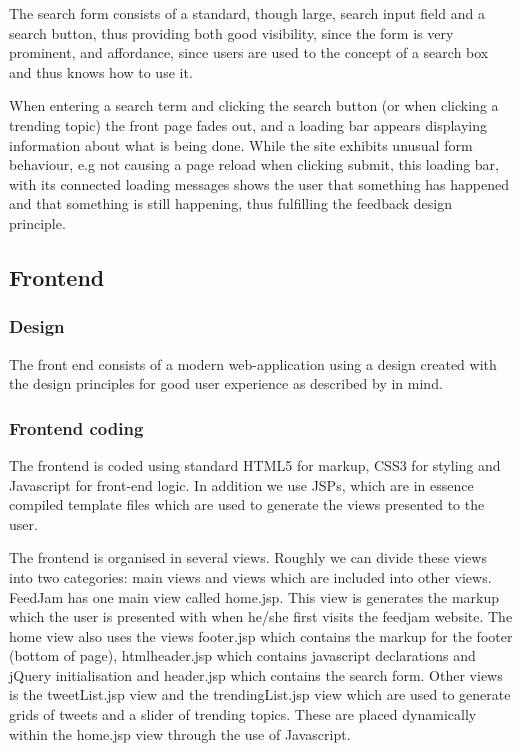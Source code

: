 The search form consists of a standard, though large, search input field and a search button, thus providing both good visibility, since the form is very prominent, and affordance, since users are used to the concept of a search box and thus knows how to use it.

When entering a search term and clicking the search button (or when clicking a trending topic) the front page fades out, and a loading bar appears displaying information about what is being done. While the site exhibits unusual form behaviour, e.g not causing a page reload when clicking submit, this loading bar, with its connected loading messages shows the user that something has happened and that something is still happening, thus fulfilling the feedback design principle.




\subsection{Frontend}
\subsubsection{Design} 
The front end consists of a modern web-application using a design created with the design principles for good user experience as described by \citet{Sharp2007} in mind.



\subsubsection{Frontend coding}
The frontend is coded using standard HTML5 for markup, CSS3 for styling and Javascript for front-end logic. In addition we use JSPs, which are in essence compiled template files which are used to generate the views presented to the user.

The frontend is organised in several views. Roughly we can divide these views into two categories: main views and views which are included into other views. FeedJam has one main view called home.jsp. This view is generates the markup which the user is presented with when he/she first visits the feedjam website. The home view also uses the views footer.jsp which contains the markup for the footer (bottom of page), htmlheader.jsp which contains javascript declarations and jQuery initialisation and header.jsp which contains the search form. Other views is the tweetList.jsp view and the trendingList.jsp view which are used to generate grids of tweets and a slider of trending topics. These are placed dynamically within the home.jsp view through the use of Javascript.

